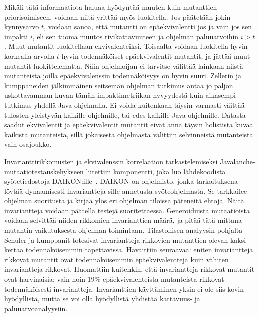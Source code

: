 \documentclass{tktltiki}
\begin{document}
Mikäli tätä informaatiota haluaa hyödyntää muuten kuin mutanttien priorisoimiseen, voidaan niitä yrittää myös luokitella. Jos päätetään jokin kynnysarvo $t$, voidaan sanoa, että mutantti on epäekvivalentti jos ja vain jos sen impakti $i$, eli sen tuoma muutos rivikattavuuteen ja ohjelman paluuarvoihin $i > t$. Muut mutantit luokitellaan ekvivalenteiksi. Toisaalta voidaan luokitella hyvin korkealla arvolla $t$ hyvin todennäköiset epäekvivalentit mutantit, ja jättää muut mutantit luokittelematta. Näin ohjelmoijan ei tarvitse välittää lainkaan niistä mutanteista joilla epäekvivalenssin todennäköisyys on hyvin suuri. Zellerin ja kumppaneiden jälkimmäinen seitsemän ohjelman tutkimus antaa jo paljon uskottavamman kuvan tämän impaktimetriikan hyvyydestä kuin aikasempi tutkimus yhdellä Java-ohjelmalla. Ei voida kuitenkaan täysin varmasti väittää tulosten yleistyvän kaikille ohjelmille, tai edes kaikille Java-ohjelmille. Datasta saadut ekvivalentit ja epäekvivalentit mutantit eivät anna täysin holistista kuvaa kaikista mutanteista, sillä jokaisesta ohjelmasta valittiin selvinneistä mutanteista vain osajoukko.

Invarianttirikkomusten ja ekvivalenssin korrelaation tarkastelemiseksi Javalanche-mutaatiotestauskehykseen liitettiin komponentti, joka luo lähdekoodista syötetiedostoja DAIKON:ille~\cite{ErnstPGMPTX2007}. DAIKON on ohjelmisto, jonka tarkoituksena löytää dynaamisesti invariantteja sille annetusta syöteohjelmasta. Se tarkkailee ohjelman suoritusta ja kirjaa ylös eri ohjelman tiloissa päteneitä ehtoja. Näitä invariantteja voidaan päätellä testejä suoritettaessa. Generoiduista mutaatioista voidaan selvittää niiden rikkomien invarianttien määrä, ja pitää tätä mittana mutantin vaikutuksesta ohjelman toimintaan. Tilastollisen analyysin pohjalta Schuler ja kumppanit totesivat invariantteja rikkovien mutanttien olevan kaksi kertaa todennäköisemmin tapettavissa. Havaittiin seuraavaa: eniten invariantteja rikkovat mutantit ovat todennäköisemmin epäekvivalentteja kuin vähiten invariantteja rikkovat. Huomattiin kuitenkin, että invariantteja rikkovat mutantit ovat harvinaisia: vain noin 19\% epäekvivalenteista mutanteista rikkovat todennäköisesti invariantteja. Invarianttien käyttäminen yksin ei ole siis kovin hyödyllistä, mutta se voi olla hyödyllistä yhdistää kattavuus- ja paluuarvoanalyysiin.
\end{document}
